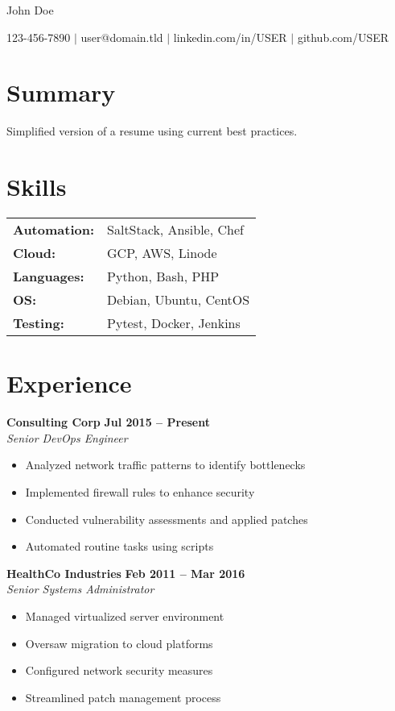 \documentclass[letterpaper,10pt]{article}
\newcommand{\contactline}[1]{
  \begin{center}
    \small #1
  \end{center}
}
\newcommand{\jobheading}[4]{
  \vspace{5pt}
  \textbf{#1} \hfill \textbf{#2}\\
  \textit{#3} \hfill \textit{#4}\\
}
\newenvironment{resumelist}{
  \begin{itemize}[leftmargin=*, itemsep=-2pt]
}{
  \end{itemize}
}
\begin{document}
\begin{center}
  {\Huge\color{accent} John Doe}\\[5pt]
  \contactline{
    123-456-7890 $|$ user@domain.tld $|$ 
    linkedin.com/in/USER $|$ github.com/USER
  }
\end{center}

\section*{Summary}
Simplified version of a resume using current best practices.

\section{Skills}
\begin{tabular}{@{}ll@{}}
  \textbf{Automation:} & SaltStack, Ansible, Chef \\
  \textbf{Cloud:} & GCP, AWS, Linode \\
  \textbf{Languages:} & Python, Bash, PHP \\
  \textbf{OS:} & Debian, Ubuntu, CentOS \\
  \textbf{Testing:} & Pytest, Docker, Jenkins \\
\end{tabular}

\section{Experience}

\jobheading{Consulting Corp}{Jul 2015 -- Present}
{Senior DevOps Engineer}{}
\begin{resumelist}
  \item Analyzed network traffic patterns to identify bottlenecks
  \item Implemented firewall rules to enhance security
  \item Conducted vulnerability assessments and applied patches
  \item Automated routine tasks using scripts
\end{resumelist}

\jobheading{HealthCo Industries}{Feb 2011 -- Mar 2016}
{Senior Systems Administrator}{}
\begin{resumelist}
  \item Managed virtualized server environment
  \item Oversaw migration to cloud platforms
  \item Configured network security measures
  \item Streamlined patch management process
\end{resumelist}
\end{document}
